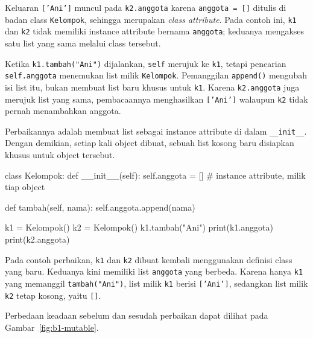 \begin{keluaran}
['Ani']
\end{keluaran}

Keluaran \texttt{['Ani']} muncul pada \texttt{k2.anggota} karena \texttt{anggota = []} ditulis di badan class \texttt{Kelompok}, sehingga merupakan \emph{class attribute}. Pada contoh ini, \texttt{k1} dan \texttt{k2} tidak memiliki instance attribute bernama \texttt{anggota}; keduanya mengakses satu list yang sama melalui class tersebut.

Ketika \texttt{k1.tambah("Ani")} dijalankan, \texttt{self} merujuk ke \texttt{k1}, tetapi pencarian \texttt{self.anggota} menemukan list milik \texttt{Kelompok}. Pemanggilan \texttt{append()} mengubah isi list itu, bukan membuat list baru khusus untuk \texttt{k1}. Karena \texttt{k2.anggota} juga merujuk list yang sama, pembacaannya menghasilkan \texttt{['Ani']} walaupun \texttt{k2} tidak pernah menambahkan anggota.

Perbaikannya adalah membuat list sebagai instance attribute di dalam \texttt{\_\_init\_\_}. Dengan demikian, setiap kali object dibuat, sebuah list kosong baru disiapkan khusus untuk object tersebut.

\begin{kode}[Perbaikan]
class Kelompok:
    def __init__(self):
        self.anggota = []          # instance attribute, milik tiap object

    def tambah(self, nama):
        self.anggota.append(nama)

k1 = Kelompok()
k2 = Kelompok()
k1.tambah("Ani")
print(k1.anggota)
print(k2.anggota)
\end{kode}

\begin{keluaran}
['Ani']
[]
\end{keluaran}

Pada contoh perbaikan, \texttt{k1} dan \texttt{k2} dibuat kembali menggunakan definisi class yang baru. Keduanya kini memiliki list \texttt{anggota} yang berbeda. Karena hanya \texttt{k1} yang memanggil \texttt{tambah("Ani")}, list milik \texttt{k1} berisi \texttt{['Ani']}, sedangkan list milik \texttt{k2} tetap kosong, yaitu \texttt{[]}.

Perbedaan keadaan sebelum dan sesudah perbaikan dapat dilihat pada Gambar~\ref{fig:b1-mutable}.

